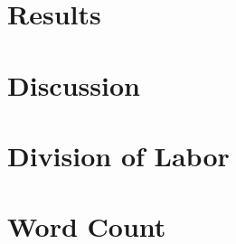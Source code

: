 \documentclass{article}
\begin{document}
\section{Results}


\section{Discussion}






\section{Division of Labor}


\section{Word Count}
\end{document}

